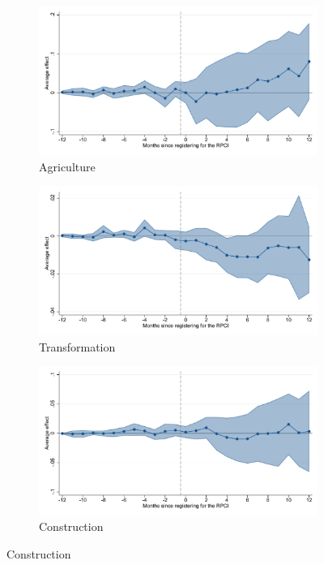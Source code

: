 \begin{figure}[H]
    \begin{subfigure}{0.32\textwidth}
    \caption{Agriculture}
    \includegraphics[width=\textwidth]{04_Figures/muestra_10porciento/event_study_alta_ind_agricul_dcdh_connected.pdf}
    \end{subfigure}
    \begin{subfigure}{0.32\textwidth}
    \caption{Transformation}
    \includegraphics[width=\textwidth]{04_Figures/muestra_10porciento/event_study_alta_ind_transf_dcdh_connected.pdf}
    \end{subfigure}
    \begin{subfigure}{0.32\textwidth}
    \caption{Construction}
    \includegraphics[width=\textwidth]{04_Figures/muestra_10porciento/event_study_alta_ind_constr_dcdh_connected.pdf}
    \end{subfigure}


\end{figure}
